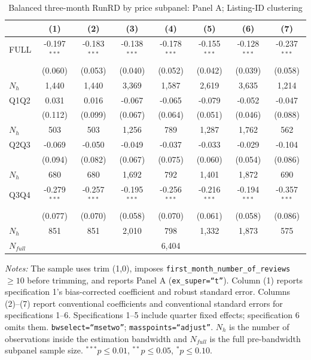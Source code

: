 \begin{table}[!htbp]
\centering
\caption{Balanced three-month RunRD by price subpanel: Panel A; Listing-ID clustering}
\scriptsize
\setlength{\tabcolsep}{5pt}
\begin{tabular}{l*{7}{c}}
\toprule
 & (1) & (2) & (3) & (4) & (5) & (6) & (7) \\
\midrule
FULL & -0.197$^{***}$ & -0.183$^{***}$ & -0.138$^{***}$ & -0.178$^{***}$ & -0.155$^{***}$ & -0.128$^{***}$ & -0.237$^{***}$ \\
 & (0.060) & (0.053) & (0.040) & (0.052) & (0.042) & (0.039) & (0.058) \\
$N_h$ & 1,440 & 1,440 & 3,369 & 1,587 & 2,619 & 3,635 & 1,214 \\
\addlinespace
Q1Q2 & 0.031 & 0.016 & -0.067 & -0.065 & -0.079 & -0.052 & -0.047 \\
 & (0.112) & (0.099) & (0.067) & (0.064) & (0.051) & (0.046) & (0.088) \\
$N_h$ & 503 & 503 & 1,256 & 789 & 1,287 & 1,762 & 562 \\
\addlinespace
Q2Q3 & -0.069 & -0.050 & -0.049 & -0.037 & -0.033 & -0.029 & -0.104 \\
 & (0.094) & (0.082) & (0.067) & (0.075) & (0.060) & (0.054) & (0.086) \\
$N_h$ & 680 & 680 & 1,692 & 792 & 1,401 & 1,872 & 690 \\
\addlinespace
Q3Q4 & -0.279$^{***}$ & -0.257$^{***}$ & -0.195$^{***}$ & -0.256$^{***}$ & -0.216$^{***}$ & -0.194$^{***}$ & -0.357$^{***}$ \\
 & (0.077) & (0.070) & (0.058) & (0.070) & (0.061) & (0.058) & (0.086) \\
$N_h$ & 851 & 851 & 2,010 & 798 & 1,332 & 1,873 & 575 \\

\midrule
$N_{full}$ & \multicolumn{7}{c}{6,404} \\
\bottomrule
\end{tabular}
\begin{minipage}{0.98\textwidth}
\footnotesize
\textit{Notes:} The sample uses trim (1,0), imposes \texttt{first\_month\_number\_of\_reviews}$\geq10$ before trimming, and reports Panel A (\texttt{ex\_super=``t''}). Column (1) reports specification 1's bias-corrected coefficient and robust standard error. Columns (2)--(7) report conventional coefficients and conventional standard errors for specifications 1--6. Specifications 1--5 include quarter fixed effects; specification 6 omits them. \texttt{bwselect=``msetwo''}; \texttt{masspoints=``adjust''}. $N_h$ is the number of observations inside the estimation bandwidth and $N_{full}$ is the full pre-bandwidth subpanel sample size. $^{***}p\leq0.01$, $^{**}p\leq0.05$, $^{*}p\leq0.10$.
\end{minipage}
\end{table}
\clearpage

